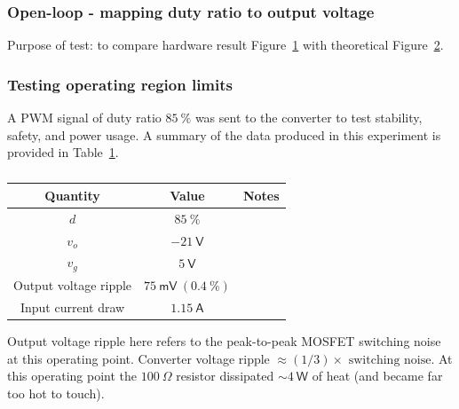 \subsubsection{Open-loop - mapping duty ratio to output voltage}
\begin{figure}[H]
\centering
{}
\caption{}
\label{fig:steps}
\end{figure}
Purpose of test: to compare hardware result Figure~\ref{fig:steps} with theoretical Figure~\ref{fig:out_parasitic}.
\begin{figure}[H]
\centering
{}
\caption{}
\label{fig:out_parasitic}
\end{figure}
\subsubsection{Testing operating region limits}
A PWM signal of duty ratio $85 \ \mathsf{\%}$ was sent to the converter to test stability, safety, and power usage. A summary of the data produced in this experiment is provided in Table~\ref{tab:heating}.
\begin{table}[H]
    \centering
    \begin{tabular}{|c|c|c|}
    \hline
    Quantity & Value & Notes\\
    \hline
    $d$ & $85 \ \mathsf{\%}$ &\\
    \hline
    $v_o$ & $\minus 21 \ \mathsf{V}$ &\\
    \hline
    $v_g$ & $5 \ \mathsf{V}$ &\\
    \hline
    Output voltage ripple & $75 \ \mathsf{mV} \ (0.4 \ \mathsf{\%})$ &\\
    \hline
    Input current draw & $1.15 \ \mathsf{A}$&\\
    \hline
    \end{tabular}
    \caption{}
    \label{tab:heating}
\end{table}
Output voltage ripple here refers to the peak-to-peak MOSFET switching noise at this operating point. Converter voltage ripple $\approx (1/3) \times \text{ switching noise}$. At this operating point the $100 \ \mathsf{\Omega}$ resistor dissipated $\sim 4 \ \mathsf{W}$ of heat (and became far too hot to touch).
